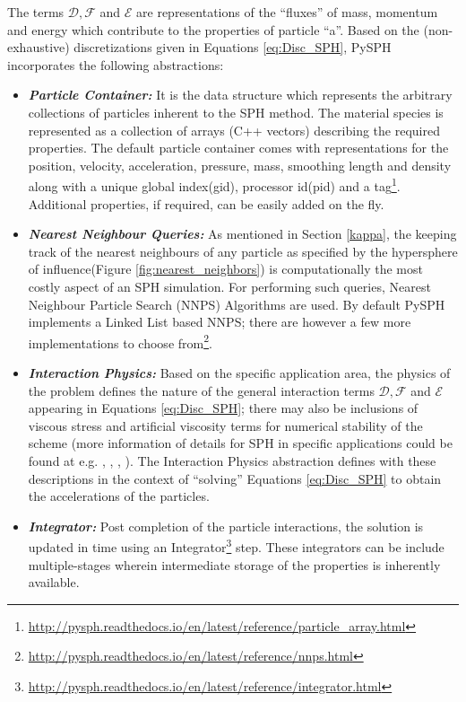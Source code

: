 The terms $\mathcal{D}, \mathcal{F}$ and $\mathcal{E}$ are representations of the ``fluxes'' of mass, momentum and energy which contribute to the properties of particle ``a''. Based on the (non-exhaustive) discretizations given in Equations \eqref{eq:Disc_SPH}, PySPH incorporates the following abstractions:

\begin{itemize}
\item \textbf{\textit{Particle Container: }}It is the data structure which represents the arbitrary collections of particles inherent to the SPH method. The material species is represented as a collection of arrays (C++ vectors) describing the required properties. The default particle container comes with representations for the position, velocity, acceleration, pressure, mass, smoothing length and density along with a unique global index(gid), processor id(pid) and a tag\footnote[4]{\url{http://pysph.readthedocs.io/en/latest/reference/particle_array.html}}. Additional properties, if required, can be easily added on the fly. 

\item \textbf{\textit{Nearest Neighbour Queries: }} As mentioned in Section \ref{kappa}, the keeping track of the nearest neighbours of any particle as specified by the hypersphere of influence(Figure \ref{fig:nearest_neighbors}) is computationally the most costly aspect of an SPH simulation. For performing such queries, Nearest Neighbour Particle Search (NNPS) Algorithms are used. By default PySPH implements a Linked List based NNPS; there are however a few more implementations to choose from\footnote[5]{\url{http://pysph.readthedocs.io/en/latest/reference/nnps.html}}.

\item \textbf{\textit{Interaction Physics: }}Based on the specific application area, the physics of the problem defines the nature of the general interaction terms  $\mathcal{D}, \mathcal{F}$ and $\mathcal{E}$ appearing in Equations \ref{eq:Disc_SPH}; there may also be inclusions of viscous stress and artificial viscosity terms for numerical stability of the scheme (more information of details for SPH in specific applications could be found at e.g. \cite{price}, \cite{monaghan_ARFM}, \cite{monaghan_physics},  \cite{volker_springel}). The Interaction Physics abstraction defines with these descriptions in the context of ``solving'' Equations \ref{eq:Disc_SPH} to obtain the accelerations of the particles.

\item \textbf{\textit{Integrator: }}Post completion of the particle interactions, the solution is updated in time using an Integrator\footnote[6]{\url{http://pysph.readthedocs.io/en/latest/reference/integrator.html}} step. These integrators can be include multiple-stages wherein intermediate storage of the properties is inherently available. 


\end{itemize}
